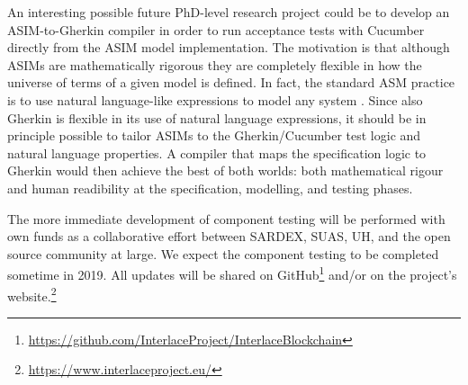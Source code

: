An interesting possible future PhD-level research project could be to develop an ASIM-to-Gherkin compiler in order to run acceptance tests with Cucumber directly from the ASIM model implementation. The motivation is that although ASIMs are mathematically rigorous they are completely flexible in how the universe of terms of a given model is defined. In fact, the standard ASM practice is to use natural language-like expressions to model any system \cite{BoergerStaerk2003,BoergerRaschke2018}. Since also Gherkin is flexible in its use of natural language expressions, it should be in principle possible to tailor ASIMs to the Gherkin/Cucumber test logic and natural language properties. A compiler that maps the specification logic to Gherkin would then achieve the best of both worlds: both mathematical rigour and human readibility at the specification, modelling, and testing phases.

The more immediate development of component testing will be performed with own funds as a collaborative effort between SARDEX, SUAS, UH, and the open source community at large. We expect the component testing to be completed sometime in 2019. All updates will be shared on GitHub\footnote{\url{https://github.com/InterlaceProject/InterlaceBlockchain}} and/or on the project's website.\footnote{\url{https://www.interlaceproject.eu/}} 

\newpage
